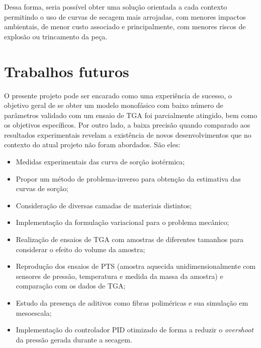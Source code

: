 Dessa forma, seria possível obter uma solução orientada a cada contexto
permitindo o uso de curvas de secagem mais arrojadas, com menores impactos
ambientais, de menor custo associado e principalmente, com menores riscos de
explosão ou trincamento da peça.

\section{Trabalhos futuros}
O presente projeto pode ser encarado como uma experiência de sucesso, o objetivo
geral de se obter um modelo monofásico com baixo número de parâmetros validado
com um ensaio de TGA foi parcialmente atingido, bem como os objetivos
específicos. Por outro lado, a baixa precisão quando comparado aos resultados
experimentais revelam a existência de novos desenvolvimentos que no contexto do
atual projeto não foram abordados. São eles:

\begin{itemize}
    \item Medidas experimentais das curva de sorção isotérmica;
    \item Propor um método de problema-inverso para obtenção da estimativa das
      curvas de sorção;
    \item Consideração de diversas camadas de materiais distintos;
    \item Implementação da formulação variacional para o problema mecânico;
    \item Realização de ensaios de TGA com amostras de diferentes tamanhos para
      considerar o efeito do volume da amostra;
    \item Reprodução dos ensaios de PTS (amostra aquecida unidimensionalmente com
      sensores de pressão, temperatura e medida da massa da amostra) e
      comparação com os dados de TGA;
    \item Estudo da presença de aditivos como fibras poliméricas e sua simulação
      em mesoescala;
    \item Implementação do controlador PID otimizado de forma a reduzir o {\it
        overshoot} da pressão gerada durante a secagem.
\end{itemize}


